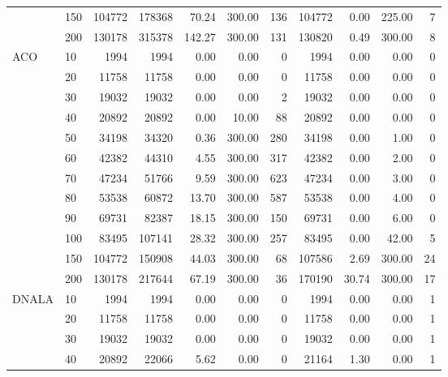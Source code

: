 \documentclass[12pt]{article}
\begin{document}
\begin{table}
{\begin{tabular}{llr|rrrr|rrrr}
   & 150 &   104772 &   178368 &  70.24 & 300.00 &        136 &   104772 &  0.00 & 225.00 &          7 \\
   & 200 &   130178 &   315378 & 142.27 & 300.00 &        131 &   130820 &  0.49 & 300.00 &          8 \\
   \midrule
ACO & 10  &     1994 &     1994 &   0.00 &   0.00 &          0 &     1994 &  0.00 &   0.00 &          0 \\
   & 20  &    11758 &    11758 &   0.00 &   0.00 &          0 &    11758 &  0.00 &   0.00 &          0 \\
   & 30  &    19032 &    19032 &   0.00 &   0.00 &          2 &    19032 &  0.00 &   0.00 &          0 \\
   & 40  &    20892 &    20892 &   0.00 &  10.00 &         88 &    20892 &  0.00 &   0.00 &          0 \\
   & 50  &    34198 &    34320 &   0.36 & 300.00 &        280 &    34198 &  0.00 &   1.00 &          0 \\
   & 60  &    42382 &    44310 &   4.55 & 300.00 &        317 &    42382 &  0.00 &   2.00 &          0 \\
   & 70  &    47234 &    51766 &   9.59 & 300.00 &        623 &    47234 &  0.00 &   3.00 &          0 \\
   & 80  &    53538 &    60872 &  13.70 & 300.00 &        587 &    53538 &  0.00 &   4.00 &          0 \\
   & 90  &    69731 &    82387 &  18.15 & 300.00 &        150 &    69731 &  0.00 &   6.00 &          0 \\
   & 100 &    83495 &   107141 &  28.32 & 300.00 &        257 &    83495 &  0.00 &  42.00 &          5 \\
   & 150 &   104772 &   150908 &  44.03 & 300.00 &         68 &   107586 &  2.69 & 300.00 &         24 \\
   & 200 &   130178 &   217644 &  67.19 & 300.00 &         36 &   170190 & 30.74 & 300.00 &         17 \\
   \midrule
DNALA & 10  &     1994 &     1994 &   0.00 &   0.00 &          0 &     1994 &  0.00 &   0.00 &          1 \\
   & 20  &    11758 &    11758 &   0.00 &   0.00 &          0 &    11758 &  0.00 &   0.00 &          1 \\
   & 30  &    19032 &    19032 &   0.00 &   0.00 &          0 &    19032 &  0.00 &   0.00 &          1 \\
   & 40  &    20892 &    22066 &   5.62 &   0.00 &          0 &    21164 &  1.30 &   0.00 &          1 \\

\end{tabular}}
\end{table}
\end{document}
